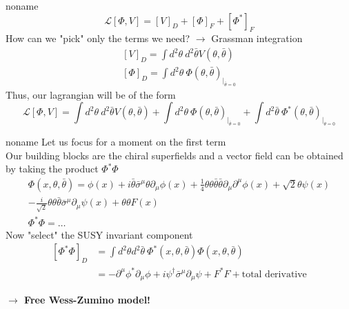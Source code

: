 \documentclass[10pt]{beamer}
\begin{document}
\begin{frame}{noname}
\begin{equation*} 
    \mathcal{L}[\Phi, V] = \left[V\right]_D + \left[\Phi\right]_F  + \left[\Phi^*\right]_F
\end{equation*}
How can we "pick" only the terms we need? $\rightarrow$ Grassman integration
\begin{gather*}
    \left[V\right]_D = \int d^2\theta \ d^2\bar\theta V(\theta, \bar\theta) \\
    \left[\Phi\right]_D = \int d^2\theta \ \Phi(\theta, \bar\theta)_{|_{\bar\theta = 0}}
\end{gather*}
Thus, our lagrangian will be of the form
\begin{equation*}
    \mathcal{L}[\Phi, V] = 
    \int d^2\theta \ d^2\bar\theta V(\theta, \bar\theta) + 
    \int d^2\theta \ \Phi(\theta, \bar\theta)_{|_{\bar\theta = 0}} + 
    \int d^2\bar\theta \ \Phi^*(\theta, \bar\theta)_{|_{\theta = 0}}
\end{equation*}
\end{frame}

\begin{frame}{noname}
    Let us focus for a moment on the first term \\
    Our building blocks are the chiral superfields and a vector field can be obtained by taking the product $\Phi^*\Phi$
    \begin{gather*}
        \Phi(x, \theta, \bar\theta) = \phi(x) + i\bar\theta \bar\sigma^{\mu}\theta \partial_{\mu}\phi(x) + \frac{1}{4}\theta\theta\bar\theta\bar\theta\partial_{\mu}\partial^{\mu}\phi(x) + \sqrt{2}\theta\psi(x)\\ 
        -\frac{i}{\sqrt{2}}\theta\theta\bar\theta\bar\sigma^{\mu}\partial_{\mu}\psi(x) + \theta\theta F(x) \\
        \Phi^*\Phi = \dots
    \end{gather*}
    Now "select" the SUSY invariant component
    \begin{align*}
        \left[\Phi^*\Phi\right]_D & = \int d^2\theta d^2\bar\theta \ \Phi^*(x, \theta, \bar\theta) \Phi(x, \theta, \bar\theta) \\
        & = \boxed{-\partial^{\mu}\phi^*\partial_{\mu}\phi + i\psi^{\dagger}\bar\sigma^{\mu}\partial_{\mu}\psi + F^*F} + \text{total derivative}
    \end{align*}
    \centerline{\bfseries $\rightarrow$ Free Wess-Zumino model!}
\end{frame}
\end{document}
